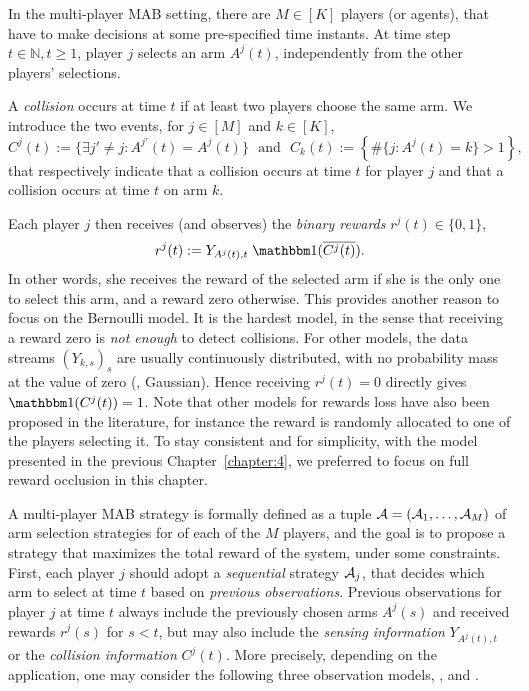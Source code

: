 In the multi-player MAB setting, there are $M \in [K]$ players (or agents),
that have to make decisions at some pre-specified time instants.
At time step $t \in\mathbb{N},t\geq1$, player $j$ selects an arm $A^j(t)$, independently from the other players' selections.

\begin{definition}
\begin{leftbar}[defnbar]  %
  A \emph{collision} occurs at time $t$ if at least two players choose the same arm.
  We introduce the two events, for $j\in[M]$ and $k\in[K]$,
  \begin{equation}
    C^j(t) :=  \{ \exists j' \neq j : A^{j'}(t) = A^j(t) \}
    \ \ \ \text{and} \ \ \ C_k(t) :=  \left\{ \# \{ j : A^j(t) = k\} > 1 \right\},
  \end{equation}
  that respectively indicate that a collision occurs at time $t$ for player $j$ and that a collision occurs at time $t$ on arm $k$.
\end{leftbar}  %
\end{definition}

Each player $j$ then receives (and observes) the \emph{binary rewards}
$r^j(t) \in \{0,1\}$,
\begin{equation}
  r^j(t) := Y_{A^j(t),t} \; \indic(\overline{C^j(t)}).
\end{equation}
In other words, she receives the reward of the selected arm if she is the only one to select this arm, and a reward zero otherwise.
This provides another reason to focus on the Bernoulli model. It is the hardest model, in the sense that receiving a reward zero is \emph{not enough} to detect collisions. For other models, the data streams $(Y_{k,s})_s$ are usually continuously distributed, with no probability mass at the value of zero (\eg, Gaussian).
Hence receiving $r^j(t) = 0$ directly gives $\indic(C^j(t)) = 1$.
%
Note that other models for rewards loss have also been proposed in the literature, for instance the reward is randomly allocated to one of the players selecting it.
To stay consistent and for simplicity, with the model presented in the previous Chapter~\ref{chapter:4},
we preferred to focus on full reward occlusion in this chapter.


A multi-player MAB strategy is formally defined as a tuple $\mathcal{A} = (\mathcal{A}_1,\dots,\mathcal{A}_M)$ of arm selection strategies for of each of the $M$ players, and the goal is to propose a strategy that maximizes the total reward of the system, under some constraints.
First, each player $j$ should adopt a \emph{sequential} strategy $\mathcal{A}_j$, that decides which arm to select at time $t$ based on \emph{previous observations}.
Previous observations for player $j$ at time $t$ always include the previously chosen arms $A^j(s)$ and received rewards $r^j(s)$ for $s<t$, but may also include the \emph{sensing information} $Y_{A^j(t),t}$ or the \emph{collision information} $C^j(t)$.
More precisely, depending on the application, one may consider the following three observation models, \modelun, \modeldeux{} and \modeltrois.

